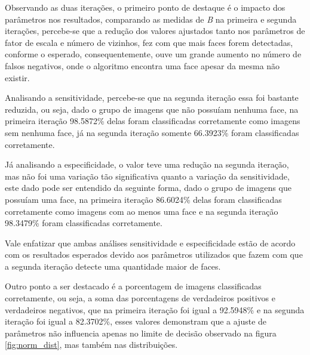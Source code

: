 Observando as duas iterações, o primeiro ponto de destaque é o impacto dos parâmetros nos resultados, comparando as medidas de \textit{B} na primeira e segunda iterações, percebe-se que a redução dos valores ajustados tanto nos parâmetros de fator de escala e número de vizinhos, fez com que mais faces forem detectadas, conforme o esperado, consequentemente, ouve um grande aumento no número de falsos negativos, onde o algoritmo encontra uma face apesar da mesma não existir. 

Analisando a sensitividade, percebe-se que na segunda iteração essa foi bastante reduzida, ou seja, dado o grupo de imagens que não possuíam nenhuma face, na primeira iteração 98.5872\% delas foram classificadas corretamente como imagens sem nenhuma face, já na segunda iteração somente 66.3923\% foram classificadas corretamente.

Já analisando a especificidade, o valor teve uma redução na segunda iteração, mas não foi uma variação tão significativa quanto a variação da sensitividade, este dado pode ser entendido da seguinte forma, dado o grupo de imagens que possuíam uma face, na primeira iteração 86.6024\% delas foram classificadas corretamente como imagens com ao menos uma face e na segunda iteração 98.3479\% foram classificadas corretamente.

Vale enfatizar que ambas análises sensitividade e especificidade estão de acordo com os resultados esperados devido aos parâmetros utilizados que fazem com que a segunda iteração detecte uma quantidade maior de faces.

Outro ponto a ser destacado é a porcentagem de imagens classificadas corretamente, ou seja, a soma das porcentagens de verdadeiros positivos e verdadeiros negativos, que na primeira iteração foi igual a 92.5948\% e na segunda iteração foi igual a 82.3702\%, esses valores demonstram que a ajuste de parâmetros não influencia apenas no limite de decisão observado na figura \ref{fig:norm_dist}, mas também nas distribuições.
